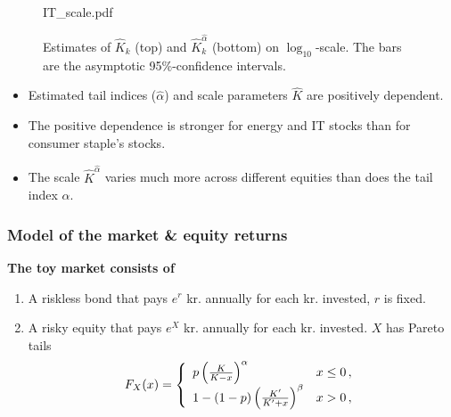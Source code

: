 \documentclass{beamer}
\begin{document}
\begin{frame}
\begin{minipage}{0.65\linewidth}
\begin{figure}[htb!]
\begin{minipage}{0.33\linewidth}
    {IT_scale.pdf}
  \end{minipage}
    \caption{\scriptsize Estimates of $\hat K_k$ (top) and
      $\hat K_k^{\hat \alpha}$ (bottom) on $\log_{10}$-scale.
      The bars are the asymptotic 95\%-confidence intervals.
    }
    \label{fig:sectors_parameters}
  \end{figure}
  \end{minipage}\hfill
  \begin{minipage}{0.35\linewidth}
    \begin{footnotesize}
      \begin{itemize}
      \item Estimated tail indices ($\hat \alpha$) and scale parameters
        $\hat K$ are positively dependent.
      \item The positive dependence is stronger for energy and IT stocks
        than for consumer staple's stocks.
      \item The scale $\hat K^{\hat \alpha}$ varies much more across different
        equities than does the tail index $\alpha$.
      \end{itemize}
    \end{footnotesize}
  \end{minipage}
\end{frame}

\begin{frame}
  \frametitle{Model of the market \& equity returns}
  \textcolor[HTML]{990033}{\bf The toy market consists of}
  \begin{enumerate}
  \item A riskless bond that pays $e^r$ kr. annually for each kr. invested,
    $r$ is fixed.
  \item A risky equity that pays $e^X$ kr. annually for each kr. invested.
    $X$ has Pareto tails
    \[
    F_X(x) = \left\{
      \begin{array}{ll}
        p \left(
          {K \over K - x}
        \right)^\alpha & x \leq 0 \,,\\
        1 - (1 - p) \left(
          {K' \over K' + x}
        \right)^\beta & x > 0\,,
      \end{array}
    \right.
    \]
  \end{enumerate}
\end{frame}
\end{document}
